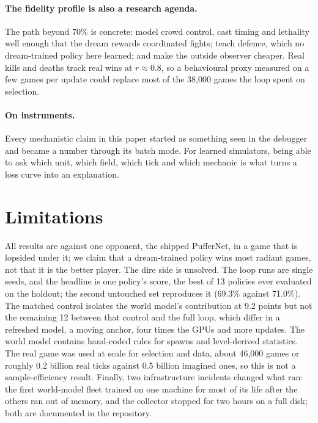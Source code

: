 \documentclass[11pt]{article}
\begin{document}
\paragraph{The fidelity profile is also a research agenda.} The path beyond 70\% is concrete: model crowd control, cast timing and lethality well enough that the dream rewards coordinated fights; teach defence, which no dream-trained policy here learned; and make the outside observer cheaper. Real kills and deaths track real wins at $r\approx0.8$, so a behavioural proxy measured on a few games per update could replace most of the 38,000 games the loop spent on selection.

\paragraph{On instruments.} Every mechanistic claim in this paper started as something seen in the debugger and became a number through its batch mode. For learned simulators, being able to ask which unit, which field, which tick and which mechanic is what turns a loss curve into an explanation.

\section{Limitations}
\label{sec:limits}

All results are against one opponent, the shipped PufferNet, in a game that is lopsided under it; we claim that a dream-trained policy wins most radiant games, not that it is the better player. The dire side is unsolved. The loop runs are single seeds, and the headline is one policy's score, the best of 13 policies ever evaluated on the holdout; the second untouched set reproduces it (69.3\% against 71.0\%). The matched control isolates the world model's contribution at 9.2 points but not the remaining 12 between that control and the full loop, which differ in a refreshed model, a moving anchor, four times the GPUs and more updates. The world model contains hand-coded rules for spawns and level-derived statistics. The real game was used at scale for selection and data, about 46,000 games or roughly 0.2 billion real ticks against 0.5 billion imagined ones, so this is not a sample-efficiency result. Finally, two infrastructure incidents changed what ran: the first world-model fleet trained on one machine for most of its life after the others ran out of memory, and the collector stopped for two hours on a full disk; both are documented in the repository.
\end{document}
